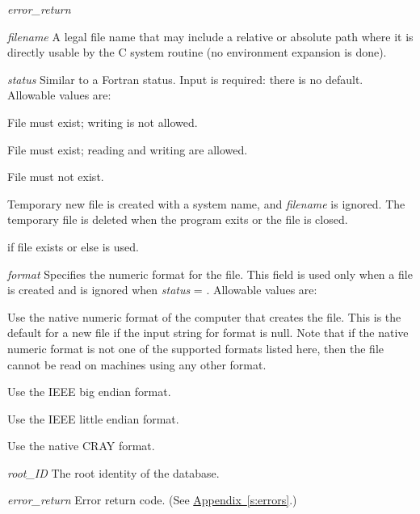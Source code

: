 \begin{Ventryi}{\textit{error\_return}}
\item[\textit{filename}]
     A legal file name that may include a relative or absolute path
     where it is directly usable by the C  system
     routine (no environment expansion is done).
\item[\textit{status}]
     Similar to a Fortran  status.
     Input is required: there is no default.
     Allowable values are:
     \begin{Ventryic}{}
     \item[\fort{READ\_ONLY}]
         File must exist; writing is not allowed.
     \item[\fort{OLD}]
          File must exist; reading and writing are allowed.
     \item[\fort{NEW}]
          File must not exist.
     \item[\fort{SCRATCH}]
          Temporary new file is created with a system name, and
          \textit{filename} is ignored.
          The temporary file is deleted when the program exits or
          the file is closed.
     \item[\fort{UNKNOWN}]
           if file exists or else  is used.
     \end{Ventryic}
\item[\textit{format}]
     Specifies the numeric format for the file.
     This field is used only when a file is created and is ignored
     when \textit{status} = .
     Allowable values are:
     \begin{Ventryic}{}
     \item[\fort{NATIVE}]
          Use the native numeric format of the computer that creates
          the file.
          This is the default for a new file if the input string for
          format is null.
          Note that if the native numeric format is not one of the
          supported formats listed here, then the file cannot be
          read on machines using any other format.
     \item[\fort{IEEE\_BIG}]
          Use the IEEE big endian format.
     \item[\fort{IEEE\_LITTLE}]
          Use the IEEE little endian format.
     \item[\fort{CRAY}]
          Use the native CRAY format.
     \end{Ventryic}
\item[\textit{root\_ID}]
     The root identity of the database.
\item[\textit{error\_return}]
     Error return code.
     (See \hyperref[s:errors]{Appendix~\ref*{s:errors}}.)
\end{Ventryi}

